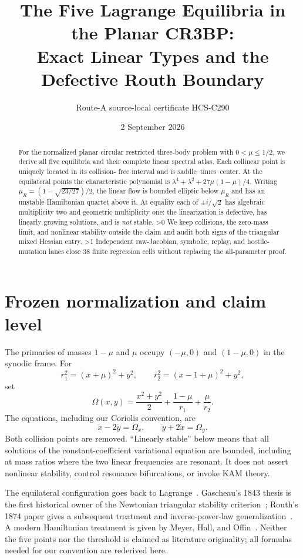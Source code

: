 \documentclass[10pt]{article}
\title{The Five Lagrange Equilibria in the Planar CR3BP:\\Exact Linear Types and the Defective Routh Boundary}
\author{Route-A source-local certificate HCS-C290}
\date{2 September 2026}
\providecommand{\CRevisionRound}{2}
\newcommand{\Om}{\Omega}
\begin{document}
\maketitle

\begin{abstract}
For the normalized planar circular restricted three-body problem with
$0<\mu\leq1/2$, we derive all five equilibria and their complete linear
spectral atlas.  Each collinear point is uniquely located in its collision-
free interval and is saddle--times--center.  At the equilateral points the
characteristic polynomial is
$\lambda^4+\lambda^2+27\mu(1-\mu)/4$.
Writing $\mu_R=(1-\sqrt{23/27})/2$, the linear flow is bounded elliptic below
$\mu_R$ and has an unstable Hamiltonian quartet above it.  At equality each
of $\pm i/\sqrt2$ has algebraic multiplicity two and geometric multiplicity
one: the linearization is defective, has linearly growing solutions, and is
\emph{not} stable.
\ifnum\CRevisionRound>0
We keep collisions, the zero-mass limit, and nonlinear stability outside the
claim and audit both signs of the triangular mixed Hessian entry.
\fi
\ifnum\CRevisionRound>1
Independent raw-Jacobian, symbolic, replay, and hostile-mutation lanes close
38 finite regression cells without replacing the all-parameter proof.
\fi
\end{abstract}

\section{Frozen normalization and claim level}
The primaries of masses $1-\mu$ and $\mu$ occupy $(-\mu,0)$ and
$(1-\mu,0)$ in the synodic frame.  For
\[
 r_1^2=(x+\mu)^2+y^2,\qquad
 r_2^2=(x-1+\mu)^2+y^2,
\]
set
\begin{equation}\label{eq:potential}
 \Om(x,y)=\frac{x^2+y^2}{2}+\frac{1-\mu}{r_1}+\frac{\mu}{r_2}.
\end{equation}
The equations, including our Coriolis convention, are
\begin{equation}\label{eq:eom}
 \ddot x-2\dot y=\Om_x,\qquad
 \ddot y+2\dot x=\Om_y.
\end{equation}
Both collision points are removed.  ``Linearly stable'' below means that all
solutions of the constant-coefficient variational equation are bounded,
including at mass ratios where the two linear frequencies are resonant.  It
does not assert nonlinear stability, control resonance bifurcations, or invoke
KAM theory.

The equilateral configuration goes back to Lagrange~\cite{Lagrange1772}.
Gascheau's 1843 thesis is the first historical owner of the Newtonian
triangular stability criterion~\cite{Gascheau1843}; Routh's 1874 paper gives a
subsequent treatment and inverse-power-law generalization~\cite{Routh1874}.
A modern Hamiltonian treatment is given by Meyer, Hall, and
Offin~\cite{MHO2009}.  Neither the five points nor the threshold is claimed as
literature originality; all formulas needed for our convention are rederived
here.
\end{document}
